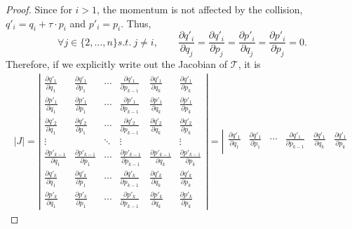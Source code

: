 \documentclass{article} %
\begin{document}
\begin{proof}

Since for $i>1$, the momentum is not affected by the collision,
$
q'_{i}=q_{i}+\tau\cdot p_{i}
$
and
$
p'_{i} =p_{i}
$.  Thus,
%   
\[
\forall j \in \{2, \ldots, n\} s.t.\ j \neq i,
\qquad
\frac{\partial q'_{i}}
{\partial q_{j}}=
\frac{\partial q'_{i}}
{\partial p_{j}}=
\frac{\partial p'_{i}}
{\partial q_{j}}=
\frac{\partial p'_{i}}
{\partial p_{j}}=0.
\]
%
Therefore, if we explicitly write out the Jacobian of $\mathcal{T}$, it is
\begin{multline}
\label{e:bozboz}
|J|=\left|\begin{array}{cccccc}
\frac{\partial q'_{1}}{\partial q_{1}} & \frac{\partial q'_{1}}{\partial p_{1}} & \cdots & \frac{\partial q'_{1}}{\partial p_{k-1}} & \frac{\partial q'_{1}}{\partial q_{k}} & \frac{\partial q'_{1}}{\partial p_{k}}\\
\frac{\partial p'_{1}}{\partial q_{1}} & \frac{\partial p'_{1}}{\partial p_{1}} & \cdots & \frac{\partial p'_{1}}{\partial p_{k-1}} & \frac{\partial p'_{1}}{\partial q_{k}} & \frac{\partial p'_{1}}{\partial p_{k}}\\
\frac{\partial q'_{2}}{\partial q_{1}} & \frac{\partial q'_{2}}{\partial p_{1}} & \cdots & \frac{\partial q'_{2}}{\partial p_{k-1}} & \frac{\partial q'_{2}}{\partial q_{k}} & \frac{\partial q'_{2}}{\partial p_{k}}\\
%
\vdots &  & \ddots & \vdots &  & \vdots\\
%
\frac{\partial p'_{k-1}}{\partial q_{1}} & \frac{\partial p'_{k-1}}{\partial p_{1}} & \cdots & \frac{\partial p'_{k-1}}{\partial p_{k-1}} & \frac{\partial p'_{k-1}}{\partial q_{k}} & \frac{\partial p'_{k-1}}{\partial p_{k}}\\
%
\frac{\partial q'_{k}}{\partial q_{1}} & \frac{\partial q'_{k}}{\partial p_{1}} & \cdots & \frac{\partial q'_{k}}{\partial p_{k-1}} & \frac{\partial q'_{k}}{\partial q_{k}} & \frac{\partial q'_{k}}{\partial p_{k}}\\
\frac{\partial p'_{k}}{\partial q_{1}} & \frac{\partial p'_{k}}{\partial p_{1}} & \cdots & \frac{\partial p'_{k}}{\partial p_{k-1}} & \frac{\partial p'_{k}}{\partial q_{k}} & \frac{\partial p'_{k}}{\partial p_{k}}
\end{array}\right|=
%
%
\left|\begin{array}{cccccc}
\frac{\partial q'_{1}}{\partial q_{1}} & \frac{\partial q'_{1}}{\partial p_{1}} & \cdots & \frac{\partial q'_{1}}{\partial p_{k-1}} & \frac{\partial q'_{1}}{\partial q_{k}} & \frac{\partial q'_{1}}{\partial p_{k}}\\

\end{array}
\end{multline}
\end{proof}
\end{document}

